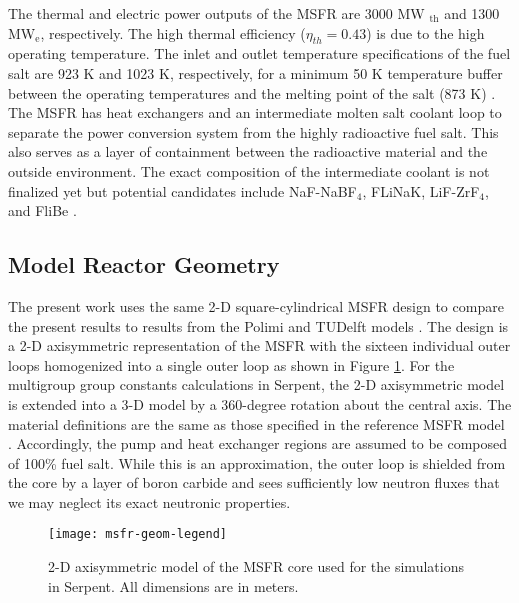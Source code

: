 The thermal and electric power outputs of the \gls{MSFR} are 3000 MW
$_{\text{th}}$ and 1300 MW$_{\text{e}}$, respectively. The high thermal
efficiency ($\eta_{th}=0.43$) is due to the high operating
temperature. The inlet and outlet temperature
specifications of the fuel salt are 923 K and 1023 K, respectively, for a
minimum 50 K temperature buffer between the
operating temperatures and the melting point of the salt (873 K)
\cite{euratom_final_2015}. The \gls{MSFR} has heat exchangers and an
intermediate molten salt coolant loop to separate the power
conversion system from the highly radioactive fuel salt. This also serves as
a layer of containment between the radioactive material and the outside
environment. The exact composition of the intermediate coolant is not
finalized yet but potential candidates include NaF-NaBF$_4$, FLiNaK,
LiF-ZrF$_4$, and FliBe \cite{merle_concept_2017}.

\subsection{Model Reactor Geometry}

The present work uses the same 2-D square-cylindrical \gls{MSFR} design to
compare the present results to results from the Polimi and TUDelft models
\cite{fiorina_modelling_2014}. The design is a 2-D axisymmetric representation
of the \gls{MSFR} with the sixteen individual outer loops homogenized into
a single outer loop as shown in Figure \ref{fig:msfrgeom}. For the multigroup
group constants calculations in Serpent, the 2-D axisymmetric model is
extended into a 3-D model by a 360-degree rotation about the
central axis. The material definitions are the same as those specified in the
reference \gls{MSFR} model \cite{brovchenko_neutronic_2019}. Accordingly, the
pump and heat exchanger regions
are assumed to be composed of 100\% fuel salt. While this is an approximation,
the outer loop is shielded from the core by a layer of boron carbide and sees
sufficiently low neutron fluxes that we may neglect its exact neutronic
properties.
%
\begin{figure}[t!] 
	\centering
	\texttt{[image: msfr-geom-legend]}
	\caption{2-D axisymmetric model of the \gls{MSFR} core used for the
	simulations in Serpent. All dimensions are in meters.
	\cite{brovchenko_neutronic_2019}}
	\label{fig:msfrgeom}
\end{figure}

